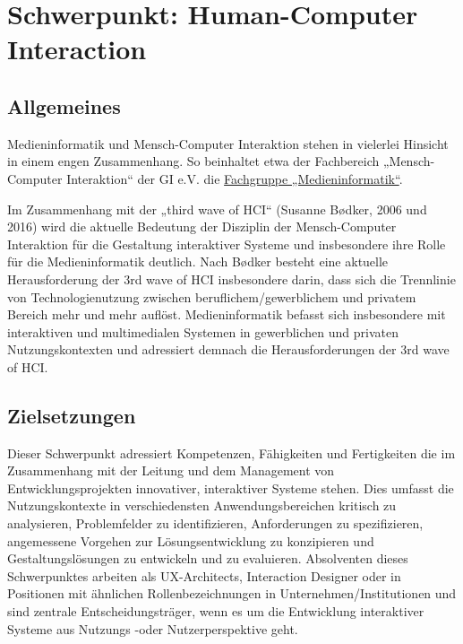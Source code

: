 \chapter{Schwerpunkt: Human-Computer
Interaction\label{/mi-2017/modulbeschreibungen-master/schwerpunkt-human-computer-interaction}}\label{schwerpunkt-human-computer-interactionpathlabelmi-2017modulbeschreibungen-masterschwerpunkt-human-computer-interaction}

\section*{Allgemeines\label{/mi-2017/modulbeschreibungen-master/schwerpunkt-human-computer-interaction}}\label{allgemeinespathlabelmi-2017modulbeschreibungen-masterschwerpunkt-human-computer-interaction}

Medieninformatik und Mensch-Computer Interaktion stehen in vielerlei
Hinsicht in einem engen Zusammenhang. So beinhaltet etwa der Fachbereich
„Mensch-Computer Interaktion`` der GI e.V. die
\href{http://fb-mci.gi.de/mensch-computer-interaktion-mci/fachgruppen/medieninformatik.html}{Fachgruppe
„Medieninformatik``}.

Im Zusammenhang mit der „third wave of HCI`` (Susanne Bødker, 2006 und
2016) wird die aktuelle Bedeutung der Disziplin der Mensch-Computer
Interaktion für die Gestaltung interaktiver Systeme und insbesondere
ihre Rolle für die Medieninformatik deutlich. Nach Bødker besteht eine
aktuelle Herausforderung der 3rd wave of HCI insbesondere darin, dass
sich die Trennlinie von Technologienutzung zwischen
beruflichem/gewerblichem und privatem Bereich mehr und mehr auflöst.
Medieninformatik befasst sich insbesondere mit interaktiven und
multimedialen Systemen in gewerblichen und privaten Nutzungskontexten
und adressiert demnach die Herausforderungen der 3rd wave of HCI.

\section*{Zielsetzungen\label{/mi-2017/modulbeschreibungen-master/schwerpunkt-human-computer-interaction}}\label{zielsetzungenpathlabelmi-2017modulbeschreibungen-masterschwerpunkt-human-computer-interaction}

Dieser Schwerpunkt adressiert Kompetenzen, Fähigkeiten und Fertigkeiten
die im Zusammenhang mit der Leitung und dem Management von
Entwicklungsprojekten innovativer, interaktiver Systeme stehen. Dies
umfasst die Nutzungskontexte in verschiedensten Anwendungsbereichen
kritisch zu analysieren, Problemfelder zu identifizieren, Anforderungen
zu spezifizieren, angemessene Vorgehen zur Lösungsentwicklung zu
konzipieren und Gestaltungslösungen zu entwickeln und zu evaluieren.
Absolventen dieses Schwerpunktes arbeiten als UX-Architects, Interaction
Designer oder in Positionen mit ähnlichen Rollenbezeichnungen in
Unternehmen/Institutionen und sind zentrale Entscheidungsträger, wenn es
um die Entwicklung interaktiver Systeme aus Nutzungs -oder
Nutzerperspektive geht.

